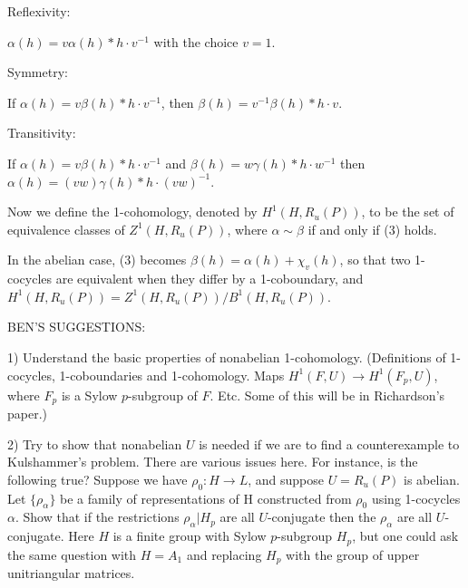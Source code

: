 Reflexivity:

$\alpha(h) = v\alpha(h)*h\cdot v^{-1}$ with the choice $v=1$.

Symmetry:

If $\alpha(h) = v\beta(h)*h\cdot v^{-1}$, then $\beta(h) = v^{-1}\beta(h)*h\cdot v$.

Transitivity:

If $\alpha(h) = v\beta(h)*h\cdot v^{-1}$ and $\beta(h) = w\gamma(h)*h\cdot w^{-1}$ then $\alpha(h) = (vw)\gamma(h)*h\cdot (vw)^{-1}$.

Now we define the 1-cohomology, denoted by $H^1(H,R_u(P))$, to be the set of equivalence classes of $Z^1(H,R_u(P))$, where $\alpha \sim \beta$ if and only if (3) holds.

In the abelian case, (3) becomes $\beta(h) = \alpha(h)+\chi_v(h)$, so that two 1-cocycles are equivalent when they differ by a 1-coboundary, and $H^1(H,R_u(P))=Z^1(H,R_u(P))/B^1(H,R_u(P))$.

BEN'S SUGGESTIONS:

1) Understand the basic properties of nonabelian 1-cohomology.  (Definitions of 1-cocycles, 1-coboundaries and 1-cohomology.  Maps $H^1(F,U)\rightarrow H^1(F_p,U)$, where $F_p$ is a Sylow $p$-subgroup of $F$.  Etc.  Some of this will be in Richardson's paper.)

2) Try to show that nonabelian $U$ is needed if we are to find a counterexample to Kulshammer's problem.  There are various issues here.  For instance, is the following true?  Suppose we have $\rho_0:H\rightarrow L$, and suppose $U=R_u(P)$ is abelian.  Let $\{\rho_\alpha\}$ be a family of representations of H constructed from $\rho_0$ using 1-cocycles $\alpha$.  Show that if the restrictions $\rho_\alpha|H_p$ are all $U$-conjugate then the $\rho_\alpha$ are all $U$-conjugate.  Here $H$ is a finite group with Sylow $p$-subgroup $H_p$, but one could ask the same question with $H=A_1$ and replacing $H_p$ with the group of upper unitriangular matrices.